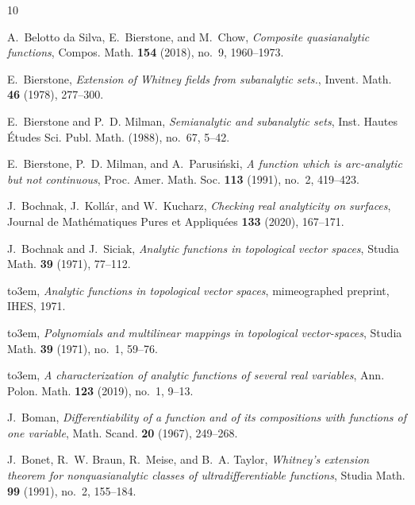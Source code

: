 \documentclass[10pt, reqno]{amsart}
\theoremstyle{plain}
\theoremstyle{definition}
\numberwithin{equation}{section}
\begin{document}
\def\cprime{$'$}
\providecommand{\bysame}{\leavevmode\hbox to3em{\hrulefill}\thinspace}
\providecommand{\MR}{\relax\ifhmode\unskip\space\fi MR }
\providecommand{\MRhref}[2]{%
    \href{http://www.ams.org/mathscinet-getitem?mr=#1}{#2}
}
\providecommand{\href}[2]{#2}
\begin{thebibliography}{10}

    A.~{Belotto da Silva}, E.~Bierstone, and M.~Chow, \emph{Composite quasianalytic functions}, Compos. Math. \textbf{154} (2018), no.~9, 1960--1973.

    E.~{Bierstone}, \emph{{Extension of Whitney fields from subanalytic sets.}}, {Invent. Math.} \textbf{46} (1978), 277--300.

    E.~Bierstone and P.~D. Milman, \emph{Semianalytic and subanalytic sets}, Inst. Hautes \'Etudes Sci. Publ. Math. (1988), no.~67, 5--42.

    E.~Bierstone, P.~D. Milman, and A.~Parusi{\'n}ski, \emph{A function which is arc-analytic but not continuous}, Proc. Amer. Math. Soc. \textbf{113} (1991), no.~2, 419--423.

    J.~Bochnak, J.~Koll{\'{a}}r, and W.~Kucharz, \emph{Checking real analyticity on surfaces}, Journal de Math{\'{e}}matiques Pures et Appliqu{\'{e}}es \textbf{133} (2020), 167--171.

    J.~Bochnak and J.~Siciak, \emph{Analytic functions in topological vector spaces}, Studia Math. \textbf{39} (1971), 77--112.

    \bysame, \emph{Analytic functions in topological vector spaces}, mimeographed preprint, IHES, 1971.

    \bysame, \emph{{Polynomials and multilinear mappings in topological vector-spaces}}, Studia Math. \textbf{39} (1971), no.~1, 59--76.

    \bysame, \emph{A characterization of analytic functions of several real variables}, Ann. Polon. Math. \textbf{123} (2019), no.~1, 9--13. 

    J.~Boman, \emph{Differentiability of a function and of its compositions with functions of one variable}, Math. Scand. \textbf{20} (1967), 249--268.

    J.~Bonet, R.~W. Braun, R.~Meise, and B.~A. Taylor, \emph{Whitney's extension theorem for nonquasianalytic classes of ultradifferentiable functions}, Studia Math. \textbf{99} (1991), no.~2, 155--184.
    


\end{thebibliography}
\end{document}
